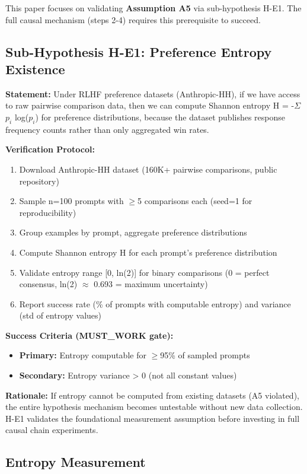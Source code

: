 This paper focuses on validating \textbf{Assumption A5} via sub-hypothesis H-E1. The full causal mechanism (steps 2-4) requires this prerequisite to succeed.

\subsection{Sub-Hypothesis H-E1: Preference Entropy Existence}

\textbf{Statement:} Under RLHF preference datasets (Anthropic-HH), if we have access to raw pairwise comparison data, then we can compute Shannon entropy H = -$\Sigma$ $p_i$ log($p_i$) for preference distributions, because the dataset publishes response frequency counts rather than only aggregated win rates.

\textbf{Verification Protocol:}
\begin{enumerate}
\item Download Anthropic-HH dataset (160K+ pairwise comparisons, public repository)
\item Sample n=100 prompts with $\geq$5 comparisons each (seed=1 for reproducibility)
\item Group examples by prompt, aggregate preference distributions
\item Compute Shannon entropy H for each prompt's preference distribution
\item Validate entropy range [0, ln(2)] for binary comparisons (0 = perfect consensus, ln(2) $\approx$ 0.693 = maximum uncertainty)
\item Report success rate (\% of prompts with computable entropy) and variance (std of entropy values)
\end{enumerate}

\textbf{Success Criteria (MUST\_WORK gate):}
\begin{itemize}
\item \textbf{Primary:} Entropy computable for $\geq$95\% of sampled prompts
\item \textbf{Secondary:} Entropy variance > 0 (not all constant values)
\end{itemize}

\textbf{Rationale:} If entropy cannot be computed from existing datasets (A5 violated), the entire hypothesis mechanism becomes untestable without new data collection. H-E1 validates the foundational measurement assumption before investing in full causal chain experiments.

\subsection{Entropy Measurement}

